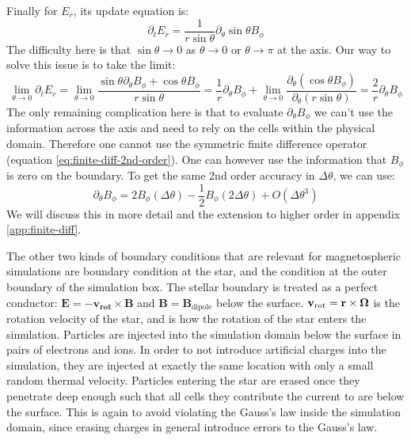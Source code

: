 Finally for $E_{r}$, its update equation is:
\begin{equation}
  \label{eq:Er-update}
  \partial_tE_r = \frac{1}{r\sin\theta}\partial_{\theta}\sin\theta B_{\phi}
\end{equation}
The difficulty here is that $\sin\theta \to 0$ as $\theta\to 0$ or
$\theta\to\pi$ at the axis. Our way to solve this issue is to take the limit:
\begin{equation}
  \label{eq:biot-savart}
  \lim_{\theta\to 0}\partial_tE_r = \lim_{\theta \to 0}\frac{\sin\theta\partial_{\theta} B_{\phi} + \cos\theta B_{\phi}}{r\sin\theta} = \frac{1}{r}\partial_{\theta}B_{\phi} + \lim_{\theta\to 0}\frac{\partial_{\theta}(\cos\theta B_{\phi})}{\partial_{\theta}(r\sin\theta)} = \frac{2}{r}\partial_{\theta}B_{\phi}
\end{equation}
The only remaining complication here is that to evaluate
$\partial_{\theta}B_{\phi}$ we can't use the information across the axis and
need to rely on the cells within the physical domain. Therefore one cannot use
the symmetric finite difference operator (equation
\eqref{eq:finite-diff-2nd-order}). One can however use the information that
$B_{\phi}$ is zero on the boundary. To get the same 2nd order accuracy in
$\Delta \theta$, we can use:
\begin{equation}
  \label{eq:one-sided-2nd-order}
  \partial_\theta B_{\phi} = 2B_{\phi}(\Delta\theta) - \frac{1}{2}B_{\phi}(2\Delta \theta) + O(\Delta \theta^{3})
\end{equation}
We will discuss this in more detail and the extension to higher order in
appendix \ref{app:finite-diff}.

The other two kinds of boundary conditions that are relevant for magnetospheric
simulations are boundary condition at the star, and the condition at the outer
boundary of the simulation box. The stellar boundary is treated as a perfect
conductor: $\mathbf{E} = -\mathbf{v}_\mathbf{rot}\times \mathbf{B}$ and
$\mathbf{B} = \mathbf{B}_\mathrm{dipole}$ below the surface.
$\mathbf{v}_\mathrm{rot} = \mathbf{r}\times \bm{\Omega}$ is the rotation velocity of
the star, and is how the rotation of the star enters the simulation. Particles
are injected into the simulation domain below the surface in pairs of electrons
and ions. In order to not introduce artificial charges into the simulation, they
are injected at exactly the same location with only a small random thermal
velocity. Particles entering the star are erased once they penetrate deep enough
such that all cells they contribute the current to are below the surface. This
is again to avoid violating the Gauss's law inside the simulation domain, since
erasing charges in general introduce errors to the Gauss's law.

